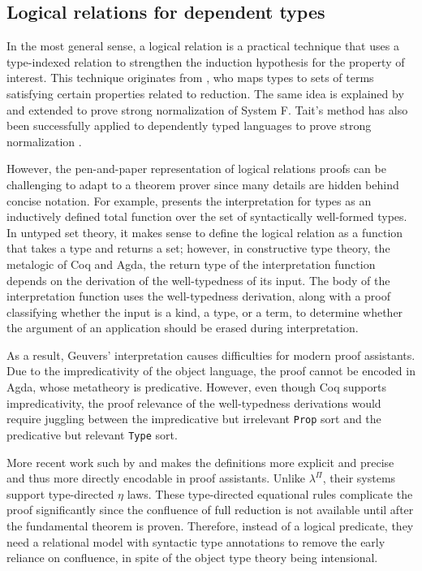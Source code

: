 \documentclass[\ifpublic nolinenum\else\fi,online,OA]{jfp}
\newcommand{\lang}{$\lambda^{\Pi}$\xspace}
\theoremstyle{definition}
\begin{document}
\subsection{Logical relations for dependent types}
In the most general sense, a logical relation is a
practical technique that uses a type-indexed relation to 
strengthen the induction hypothesis for the
property of interest. This technique originates from
\citet{tait1967:reducibility}, who maps
types to sets of terms satisfying certain properties related to reduction.
The same idea is explained by \citet{girard1989proofs} and extended to
prove strong normalization of System F.
Tait's method has also been successfully applied to dependently typed
languages to prove strong normalization \citep{Martin-Lof-1973,luo1990extended,geuvers1994short, barendregt:lambda-calculi-with-types}.

However, the pen-and-paper representation of logical relations proofs
can be challenging to adapt to a theorem prover since many details
are hidden behind concise notation.
For example, \citet{geuvers1994short} presents the interpretation for types as
an inductively defined total function over the set of syntactically
well-formed types.
In untyped set theory, it makes sense to define the logical relation as a
function that takes a type and returns a set; however,
in constructive type theory, the metalogic of Coq and Agda, the return type of
the interpretation function depends on the derivation of the well-typedness of
its input. The body of the interpretation function uses the well-typedness
derivation, along with a proof classifying whether the input is a kind, a type,
or a term, to determine whether the argument of an application should be erased
during interpretation.

As a result, Geuvers' interpretation causes difficulties for modern proof
assistants. Due to the impredicativity of the object language, the proof
cannot be encoded in Agda, whose metatheory is predicative. However, even
though Coq supports impredicativity, the proof relevance of the well-typedness
derivations would require juggling between the impredicative but irrelevant
\texttt{Prop} sort and the predicative but relevant \texttt{Type} sort.

More recent work such by \citet{Abel12} and \citet{abel2008betaeta} makes the
definitions more explicit and precise and thus more directly encodable in proof
assistants. Unlike \lang, their systems support type-directed $\eta$ laws.
These type-directed equational rules complicate the proof significantly
since the confluence of full reduction is not available until after the
fundamental theorem is proven. Therefore, instead of a logical predicate,
they need a relational model with syntactic type annotations to remove the early
reliance on confluence, in spite of the object type theory being intensional.
\end{document}
